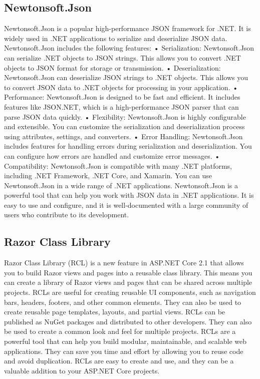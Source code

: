 \subsection{Newtonsoft.Json}
Newtonsoft.Json is a popular high-performance JSON framework for .NET. It is widely used in .NET applications to serialize and deserialize JSON data.
Newtonsoft.Json includes the following features:
•	Serialization: Newtonsoft.Json can serialize .NET objects to JSON strings. This allows you to convert .NET objects to JSON format for storage or transmission.
•	Deserialization: Newtonsoft.Json can deserialize JSON strings to .NET objects. This allows you to convert JSON data to .NET objects for processing in your application.
•	Performance: Newtonsoft.Json is designed to be fast and efficient. It includes features like JSON.NET, which is a high-performance JSON parser that can parse JSON data quickly.
•	Flexibility: Newtonsoft.Json is highly configurable and extensible. You can customize the serialization and deserialization process using attributes, settings, and converters.
•	Error Handling: Newtonsoft.Json includes features for handling errors during serialization and deserialization. You can configure how errors are handled and customize error messages.
•	Compatibility: Newtonsoft.Json is compatible with many .NET platforms, including .NET Framework, .NET Core, and Xamarin. You can use Newtonsoft.Json in a wide range of .NET applications.
Newtonsoft.Json is a powerful tool that can help you work with JSON data in .NET applications. It is easy to use and configure, and it is well-documented with a large community of users who contribute to its development.

\subsection{Razor Class Library}
Razor Class Library (RCL) is a new feature in ASP.NET Core 2.1 that allows you to build Razor views and pages into a reusable class library. This means you can create a library of Razor views and pages that can be shared across multiple projects. 
RCLs are useful for creating reusable UI components, such as navigation bars, headers, footers, and other common elements. 
They can also be used to create reusable page templates, layouts, and partial views. RCLs can be published as NuGet packages and distributed to other developers. 
They can also be used to create a common look and feel for multiple projects. RCLs are a powerful tool that can help you build modular, maintainable, and scalable web applications. 
They can save you time and effort by allowing you to reuse code and avoid duplication. RCLs are easy to create and use, and they can be a valuable addition to your ASP.NET Core projects.


